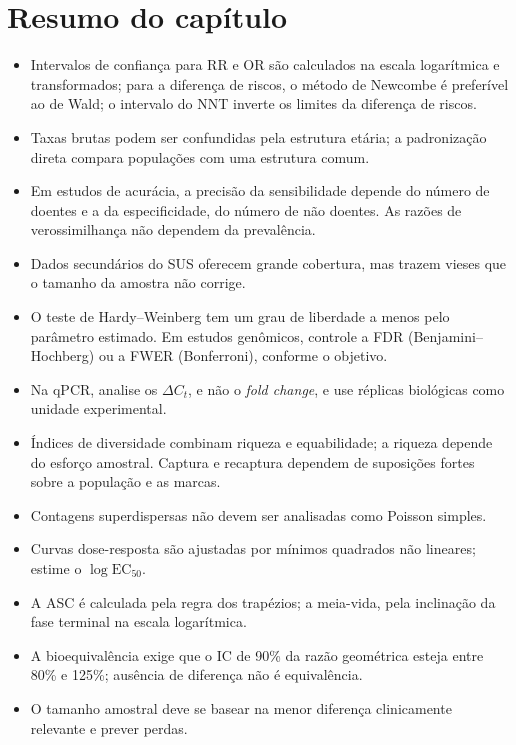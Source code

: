 \documentclass[
]{book}
\providecommand{\tightlist}{%
  \setlength{\itemsep}{0pt}\setlength{\parskip}{0pt}}
\begin{document}
\section{Resumo do capítulo}\label{resumo-do-capuxedtulo-8}

\begin{itemize}
\tightlist
\item
  Intervalos de confiança para RR e OR são calculados na escala logarítmica e transformados; para a diferença de riscos, o método de Newcombe é preferível ao de Wald; o intervalo do NNT inverte os limites da diferença de riscos.
\item
  Taxas brutas podem ser confundidas pela estrutura etária; a padronização direta compara populações com uma estrutura comum.
\item
  Em estudos de acurácia, a precisão da sensibilidade depende do número de doentes e a da especificidade, do número de não doentes. As razões de verossimilhança não dependem da prevalência.
\item
  Dados secundários do SUS oferecem grande cobertura, mas trazem vieses que o tamanho da amostra não corrige.
\item
  O teste de Hardy--Weinberg tem um grau de liberdade a menos pelo parâmetro estimado. Em estudos genômicos, controle a FDR (Benjamini--Hochberg) ou a FWER (Bonferroni), conforme o objetivo.
\item
  Na qPCR, analise os \(\Delta C_t\), e não o \emph{fold change}, e use réplicas biológicas como unidade experimental.
\item
  Índices de diversidade combinam riqueza e equabilidade; a riqueza depende do esforço amostral. Captura e recaptura dependem de suposições fortes sobre a população e as marcas.
\item
  Contagens superdispersas não devem ser analisadas como Poisson simples.
\item
  Curvas dose-resposta são ajustadas por mínimos quadrados não lineares; estime o \(\log \text{EC}_{50}\).
\item
  A ASC é calculada pela regra dos trapézios; a meia-vida, pela inclinação da fase terminal na escala logarítmica.
\item
  A bioequivalência exige que o IC de 90\% da razão geométrica esteja entre 80\% e 125\%; ausência de diferença não é equivalência.
\item
  O tamanho amostral deve se basear na menor diferença clinicamente relevante e prever perdas.
\end{itemize}
\end{document}
